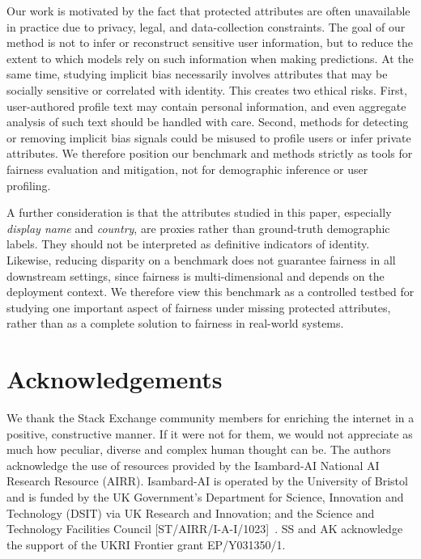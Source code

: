 \documentclass[11pt]{article}
\begin{document}
Our work is motivated by the fact that protected attributes are often unavailable in practice due to privacy, legal, and data-collection constraints. The goal of our method is not to infer or reconstruct sensitive user information, but to reduce the extent to which models rely on such information when making predictions. At the same time, studying implicit bias necessarily involves attributes that may be socially sensitive or correlated with identity. This creates two ethical risks. First, user-authored profile text may contain personal information, and even aggregate analysis of such text should be handled with care. Second, methods for detecting or removing implicit bias signals could be misused to profile users or infer private attributes. We therefore position our benchmark and methods strictly as tools for fairness evaluation and mitigation, not for demographic inference or user profiling.

A further consideration is that the attributes studied in this paper, especially \textit{display name} and \textit{country}, are proxies rather than ground-truth demographic labels. They should not be interpreted as definitive indicators of identity. Likewise, reducing disparity on a benchmark does not guarantee fairness in all downstream settings, since fairness is multi-dimensional and depends on the deployment context. We therefore view this benchmark as a controlled testbed for studying one important aspect of fairness under missing protected attributes, rather than as a complete solution to fairness in real-world systems.

















\section*{Acknowledgements}
We thank the Stack Exchange community members for enriching the internet in a positive, constructive manner. If it were not for them, we would not appreciate as much how peculiar, diverse and complex human thought can be.
The authors acknowledge the use of resources provided by the Isambard-AI National AI Research Resource (AIRR). Isambard-AI is operated by the University of Bristol and is funded by the UK Government’s Department for Science, Innovation and Technology (DSIT) via UK Research and Innovation; and the Science and Technology Facilities Council [ST/AIRR/I-A-I/1023]~\citep{mcintoshsmith2024isambardaileadershipclasssupercomputer}. SS and AK acknowledge the support of the UKRI Frontier grant
EP/Y031350/1.
\end{document}
